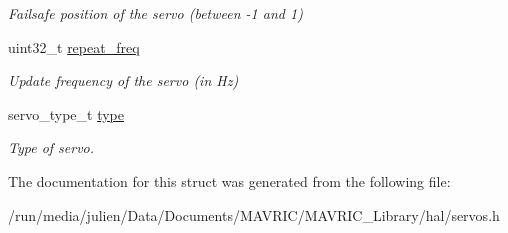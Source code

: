 \begin{DoxyCompactItemize}
\begin{DoxyCompactList}\small\item\em Failsafe position of the servo (between -\/1 and 1) \end{DoxyCompactList}\item 
\hypertarget{structservo__entry__t_afa8fe323b8d78316958f5f8d45ba2ef3}{uint32\+\_\+t \hyperlink{structservo__entry__t_afa8fe323b8d78316958f5f8d45ba2ef3}{repeat\+\_\+freq}}\label{structservo__entry__t_afa8fe323b8d78316958f5f8d45ba2ef3}

\begin{DoxyCompactList}\small\item\em Update frequency of the servo (in Hz) \end{DoxyCompactList}\item 
\hypertarget{structservo__entry__t_a761e02820fe9351b7db2944b5ba17b59}{servo\+\_\+type\+\_\+t \hyperlink{structservo__entry__t_a761e02820fe9351b7db2944b5ba17b59}{type}}\label{structservo__entry__t_a761e02820fe9351b7db2944b5ba17b59}

\begin{DoxyCompactList}\small\item\em Type of servo. \end{DoxyCompactList}\end{DoxyCompactItemize}


The documentation for this struct was generated from the following file\+:\begin{DoxyCompactItemize}
\item 
/run/media/julien/\+Data/\+Documents/\+M\+A\+V\+R\+I\+C/\+M\+A\+V\+R\+I\+C\+\_\+\+Library/hal/servos.\+h\end{DoxyCompactItemize}
